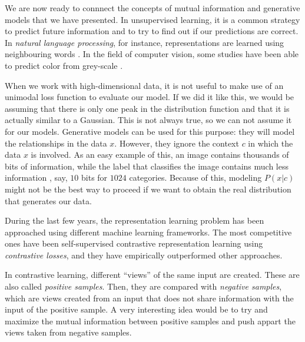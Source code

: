
\label{Chapter:CPC}
We are now ready to connnect the concepts of mutual information and generative models that we have presented. In unsupervised learning,
it is a common strategy to predict future information and to try to find out if our predictions are correct.
In \emph{natural language processing}, for instance, representations are learned 
using neighbouring words \citep{mikolov_efficient_2013}. In the field of computer vision, some studies have been able to predict color from grey-scale \citep{doersch_unsupervised_2016}.

When we work with high-dimensional data, it is not useful to make use of an unimodal loss function to evaluate our model. If we did it like this, we would be assuming that there is only
one peak in the distribution function and that it is actually similar to a Gaussian.  This is not always true, so we can not assume it for our models. Generative models can be used for this purpose:
they will model the relationships in the data $x$. However, they ignore the context $c$ in which the data $x$ is involved. As an easy example of this, an image contains thousands of bits of information,
while the label that classifies the image contains much less information , say, $10$ bits for $1024$ categories. Because of this, modeling $P(x|c)$ might not be the best way to proceed if we want
to obtain the real distribution that generates our data. 

During the last few years, the representation learning problem has been approached using different machine learning frameworks. The most competitive ones have been self-supervised contrastive representation learning \cite{oord_representation_2019,tian_what_2020,hjelm_learning_2019,gutmann_noise-contrastive_nodate,chen_simple_2020,he_momentum_2020} using \emph{contrastive losses}, and they have empirically outperformed other approaches.     

In contrastive learning, different ``views'' of the same input are created. These are also called \emph{positive samples}. Then, they are compared with \emph{negative samples}, which are views created from an input that does not share information with the input of the positive sample. A very interesting idea would be to try and maximize the mutual information between positive samples and push appart the views taken from negative samples. 

